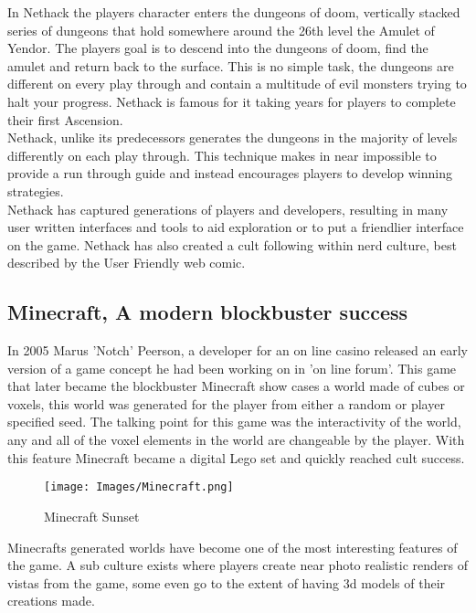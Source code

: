 In Nethack the players character enters the dungeons of doom, vertically stacked
series of dungeons that hold somewhere around the 26th level the Amulet of 
Yendor. The players goal is to descend into the dungeons of doom, find the
amulet and return back to the surface. This is no simple task, the dungeons are 
different on every play through and contain a multitude of evil monsters trying
to halt your progress. Nethack is famous for it taking years for players to 
complete their first Ascension.\\

Nethack, unlike its predecessors generates the dungeons in the majority of levels
differently on each play through. This technique makes in near impossible to 
provide a run through guide and instead encourages players to develop winning
strategies.\\

Nethack has captured generations of players and developers, resulting in many 
user written interfaces and tools to aid exploration or to put a friendlier 
interface on the game. Nethack has also created a cult following within nerd 
culture, best described by the User Friendly web comic.\\

\subsection*{Minecraft, A modern blockbuster success}
In 2005 Marus 'Notch' Peerson, a developer for an on line casino released an
early version of a game concept he had been working on in 'on line forum'. This
game that later became the blockbuster Minecraft show cases a world made of cubes 
or voxels, this world was generated for the player from either a random or 
player specified seed. The talking point for this game was the interactivity of
the world, any and all of the voxel elements in the world are changeable by the
player. With this feature Minecraft became a digital Lego set and quickly 
reached cult success.\\

\begin{figure}[h!]
  \texttt{[image: Images/Minecraft.png]}
  \caption{Minecraft Sunset}
\end{figure}

Minecrafts generated worlds have become one of the most interesting features of 
the game. A sub culture exists where players create near photo realistic renders
of vistas from the game, some even go to the extent of having 3d models of their
creations made. \\
